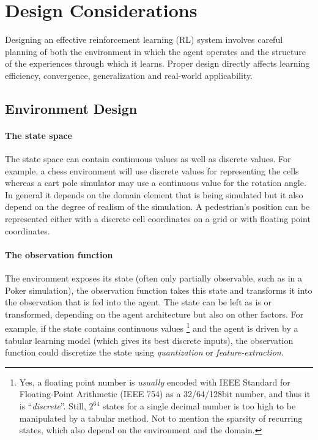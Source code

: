 \section{Design Considerations}

Designing an effective reinforcement learning (RL) system involves careful planning of both the environment in which the agent operates and the structure of the experiences through which it learns. Proper design directly affects learning efficiency, convergence, generalization and real-world applicability.

\subsection{Environment Design}

\paragraph{The state space}

The state space can contain continuous values as well as discrete values. For example, a chess environment will use discrete values for representing the cells whereas a cart pole \cite{nagendra2017comparison} simulator may use a continuous value for the rotation angle. In general it depends on the domain element that is being simulated but it also depend on the degree of realism of the simulation. A pedestrian's position can be represented either with a discrete cell coordinates on a grid or with floating point coordinates.

\paragraph{The observation function}

The environment exposes its state (often only partially observable, such as in a Poker simulation), the observation function takes this state and transforms it into the observation that is fed into the agent.
The state can be left as is or transformed, depending on the agent architecture but also on other factors. For example, if the state contains continuous values \footnote{Yes, a floating point number is \textit{usually} encoded with IEEE Standard for Floating-Point Arithmetic (IEEE 754) as a 32/64/128bit number, and thus it is ``\textit{discrete}''. Still, $2^{64}$ states for a single decimal number is too high to be manipulated by a tabular method. Not to mention the sparsity of recurring states, which also depend on the environment and the domain.} and the agent is driven by a tabular learning model (which gives its best discrete inputs), the observation function could discretize the state using \textit{quantization} or \textit{feature-extraction}.

